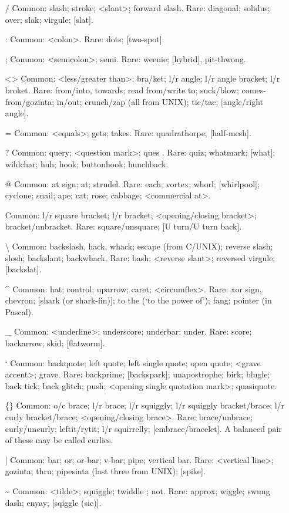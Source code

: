 \documentclass[10pt,twoside,openright]{memoir}
\begin{document}
{\begin{itemize}
\item[{\ttfamily /}] Common: slash; stroke; <slant>; forward slash. Rare: diagonal; solidus; over; slak; virgule; [slat].
\item[{\ttfamily :}] Common: <colon>. Rare: dots; [two-spot].
\item[{\ttfamily ;}] Common: <semicolon>; semi. Rare: weenie; [hybrid], pit-thwong.
\item[{\ttfamily <>}] Common: <less/greater than>; bra/ket; l/r angle; l/r angle bracket; l/r broket. Rare: from/{into, towards}; read from/write to; suck/blow; comes-from/gozinta; in/out; crunch/zap (all from UNIX); tic/tac; [angle/right angle].
\item[{\ttfamily =}] Common: <equals>; gets; takes. Rare: quadrathorpe; [half-mesh].
\item[{\ttfamily ?}] Common: query; <question mark>; ques . Rare: quiz; whatmark; [what]; wildchar; huh; hook; buttonhook; hunchback.
\item[{\ttfamily @}] Common: at sign; at; strudel. Rare: each; vortex; whorl; [whirlpool]; cyclone; snail; ape; cat; rose; cabbage; <commercial at>.
\item[{\ttfamily []}] Common: l/r square bracket; l/r bracket; <opening/closing bracket>; bracket/unbracket. Rare: square/unsquare; [U turn/U turn back].
\item[{\ttfamily \textbackslash}] Common: backslash, hack, whack; escape (from C/UNIX); reverse slash; slosh; backslant; backwhack. Rare: bash; <reverse slant>; reversed virgule; [backslat].
\item[{\ttfamily \textasciicircum}] Common: hat; control; uparrow; caret; <circumflex>. Rare: xor sign, chevron; [shark (or shark-fin)]; to the (`to the power of'); fang; pointer (in Pascal).
\item[{\ttfamily \_}] Common: <underline>; underscore; underbar; under. Rare: score; backarrow; skid; [flatworm].
\item[{\ttfamily `}] Common: backquote; left quote; left single quote; open quote; <grave accent>; grave. Rare: backprime; [backspark]; unapostrophe; birk; blugle; back tick; back glitch; push; <opening single quotation mark>; quasiquote.
\item[{\ttfamily \{\}}] Common: o/c brace; l/r brace; l/r squiggly; l/r squiggly bracket/brace; l/r curly bracket/brace; <opening/closing brace>. Rare: brace/unbrace; curly/uncurly; leftit/rytit; l/r squirrelly; [embrace/bracelet]. A balanced pair of these may be called curlies.
\item[{\ttfamily |}] Common: bar; or; or-bar; v-bar; pipe; vertical bar. Rare: <vertical line>; gozinta; thru; pipesinta (last three from UNIX); [spike].
\item[{\ttfamily \textasciitilde}] Common: <tilde>; squiggle; twiddle ; not. Rare: approx; wiggle; swung dash; enyay; [sqiggle (sic)].

\end{itemize}
}
\end{document}
